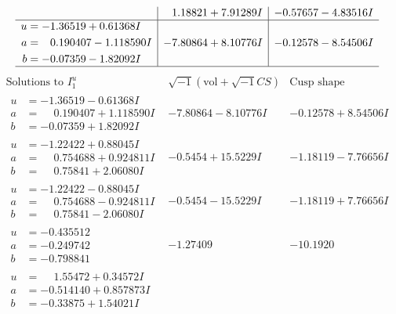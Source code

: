 \documentclass[1p]{elsarticle_modified}
\theoremstyle{definition}
\newcommand{\I}{\sqrt{-1}}
\begin{document}
$$\begin{array}{c|c|c}
 & \phantom{-}1.18821 + 7.91289 I & -0.57657 - 4.83516 I \\ \hline\begin{aligned}
u &= -1.36519 + 0.61368 I \\
a &= \phantom{-}0.190407 - 1.118590 I \\
b &= -0.07359 - 1.82092 I\end{aligned}
 & -7.80864 + 8.10776 I & -0.12578 - 8.54506 I\\
 \hline 
 \end{array}$$\newpage$$\begin{array}{c|c|c}  
\text{Solutions to }I^u_{1}& \I (\text{vol} + \sqrt{-1}CS) & \text{Cusp shape}\\
 \hline 
\begin{aligned}
u &= -1.36519 - 0.61368 I \\
a &= \phantom{-}0.190407 + 1.118590 I \\
b &= -0.07359 + 1.82092 I\end{aligned}
 & -7.80864 - 8.10776 I & -0.12578 + 8.54506 I \\ \hline\begin{aligned}
u &= -1.22422 + 0.88045 I \\
a &= \phantom{-}0.754688 + 0.924811 I \\
b &= \phantom{-}0.75841 + 2.06080 I\end{aligned}
 & -0.5454 + 15.5229 I & -1.18119 - 7.76656 I \\ \hline\begin{aligned}
u &= -1.22422 - 0.88045 I \\
a &= \phantom{-}0.754688 - 0.924811 I \\
b &= \phantom{-}0.75841 - 2.06080 I\end{aligned}
 & -0.5454 - 15.5229 I & -1.18119 + 7.76656 I \\ \hline\begin{aligned}
u &= -0.435512\phantom{ +0.000000I} \\
a &= -0.249742\phantom{ +0.000000I} \\
b &= -0.798841\phantom{ +0.000000I}\end{aligned}
 & -1.27409\phantom{ +0.000000I} & -10.1920\phantom{ +0.000000I} \\ \hline\begin{aligned}
u &= \phantom{-}1.55472 + 0.34572 I \\
a &= -0.514140 + 0.857873 I \\
b &= -0.33875 + 1.54021 I\end{aligned}

\end{array}$$
\end{document}
